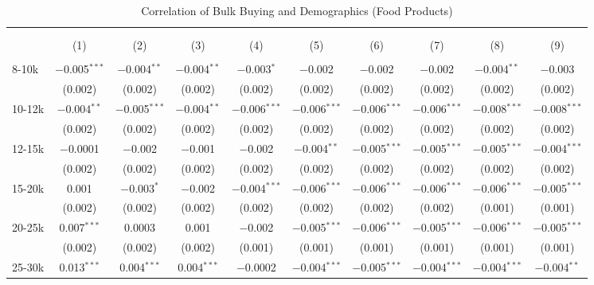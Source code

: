 
\begin{table}[!htbp] \centering 
  \caption{Correlation of Bulk Buying and Demographics (Food Products)} 
  \label{tab:discountingBehaviorFood} 
\begin{tabular}{@{\extracolsep{5pt}}lccccccccc} 
\\[-1.8ex]\hline 
\hline \\[-1.8ex] 
\\[-1.8ex] & (1) & (2) & (3) & (4) & (5) & (6) & (7) & (8) & (9)\\ 
\hline \\[-1.8ex] 
 8-10k & $-$0.005$^{***}$ & $-$0.004$^{**}$ & $-$0.004$^{**}$ & $-$0.003$^{*}$ & $-$0.002 & $-$0.002 & $-$0.002 & $-$0.004$^{**}$ & $-$0.003 \\ 
  & (0.002) & (0.002) & (0.002) & (0.002) & (0.002) & (0.002) & (0.002) & (0.002) & (0.002) \\ 
  10-12k & $-$0.004$^{**}$ & $-$0.005$^{***}$ & $-$0.004$^{**}$ & $-$0.006$^{***}$ & $-$0.006$^{***}$ & $-$0.006$^{***}$ & $-$0.006$^{***}$ & $-$0.008$^{***}$ & $-$0.008$^{***}$ \\ 
  & (0.002) & (0.002) & (0.002) & (0.002) & (0.002) & (0.002) & (0.002) & (0.002) & (0.002) \\ 
  12-15k & $-$0.0001 & $-$0.002 & $-$0.001 & $-$0.002 & $-$0.004$^{**}$ & $-$0.005$^{***}$ & $-$0.005$^{***}$ & $-$0.005$^{***}$ & $-$0.004$^{***}$ \\ 
  & (0.002) & (0.002) & (0.002) & (0.002) & (0.002) & (0.002) & (0.002) & (0.002) & (0.002) \\ 
  15-20k & 0.001 & $-$0.003$^{*}$ & $-$0.002 & $-$0.004$^{***}$ & $-$0.006$^{***}$ & $-$0.006$^{***}$ & $-$0.006$^{***}$ & $-$0.006$^{***}$ & $-$0.005$^{***}$ \\ 
  & (0.002) & (0.002) & (0.002) & (0.002) & (0.002) & (0.002) & (0.002) & (0.001) & (0.001) \\ 
  20-25k & 0.007$^{***}$ & 0.0003 & 0.001 & $-$0.002 & $-$0.005$^{***}$ & $-$0.006$^{***}$ & $-$0.005$^{***}$ & $-$0.006$^{***}$ & $-$0.005$^{***}$ \\ 
  & (0.002) & (0.002) & (0.002) & (0.001) & (0.001) & (0.001) & (0.001) & (0.001) & (0.001) \\ 
  25-30k & 0.013$^{***}$ & 0.004$^{***}$ & 0.004$^{***}$ & $-$0.0002 & $-$0.004$^{***}$ & $-$0.005$^{***}$ & $-$0.004$^{***}$ & $-$0.004$^{***}$ & $-$0.004$^{**}$ \\ 

\end{tabular}
\end{table}
